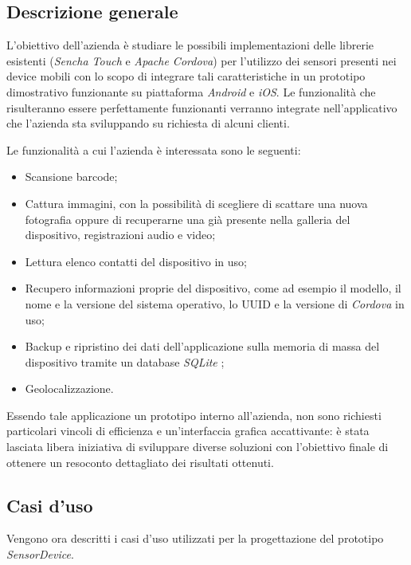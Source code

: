 \subsection{Descrizione generale}
L'obiettivo dell'azienda è studiare le possibili implementazioni delle librerie esistenti (\emph{Sencha Touch} e \emph{Apache Cordova}) per l'utilizzo dei sensori presenti nei device mobili con lo scopo di integrare tali caratteristiche in un prototipo dimostrativo funzionante su piattaforma \emph{Android} e \emph{iOS}.
Le funzionalità che risulteranno essere perfettamente funzionanti verranno integrate nell'applicativo che l'azienda sta sviluppando su richiesta di alcuni clienti.

Le funzionalità a cui l'azienda è interessata sono le seguenti:
\begin{itemize}
\item Scansione barcode;
\item Cattura immagini, con la possibilità di scegliere di scattare una nuova fotografia oppure di recuperarne una già presente nella galleria del dispositivo, registrazioni audio e video;
\item Lettura elenco contatti del dispositivo in uso;
\item Recupero informazioni proprie del dispositivo, come ad esempio il modello, il nome e la versione del sistema operativo, lo \ac{UUID} e la versione di \emph{Cordova} in uso;
\item Backup e ripristino dei dati dell'applicazione sulla memoria di massa del dispositivo tramite un database \emph{SQLite} \cite{hipp:sqlite};
\item Geolocalizzazione.
\end{itemize}

Essendo tale applicazione un prototipo interno all'azienda, non sono richiesti particolari vincoli di efficienza e un'interfaccia grafica accattivante: è stata lasciata libera iniziativa di sviluppare diverse soluzioni con l'obiettivo finale di ottenere un resoconto dettagliato dei risultati ottenuti.

\subsection{Casi d'uso}
Vengono ora descritti i casi d'uso utilizzati per la progettazione del prototipo \emph{SensorDevice}.

